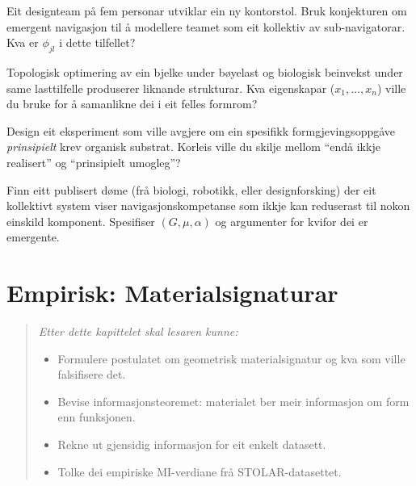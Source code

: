 \begin{exercise}[Nivå 2]\label{ex:6.3}
Eit designteam på fem personar utviklar ein ny kontorstol. Bruk
konjekturen om emergent navigasjon til å modellere teamet som eit
kollektiv av sub-navigatorar. Kva er $\phi_{jl}$ i dette
tilfellet?
\end{exercise}

\begin{exercise}[Nivå 2]\label{ex:6.4}
Topologisk optimering av ein bjelke under bøyelast og biologisk
beinvekst under same lasttilfelle produserer liknande strukturar.
Kva eigenskapar ($x_1, \ldots, x_n$) ville du bruke for å
samanlikne dei i eit felles formrom?
\end{exercise}

\begin{exercise}[Nivå 3]\label{ex:6.5}
Design eit eksperiment som ville avgjere om ein spesifikk
formgjevingsoppgåve \emph{prinsipielt} krev organisk substrat.
Korleis ville du skilje mellom ``endå ikkje realisert'' og
``prinsipielt umogleg''?
\end{exercise}

\begin{exercise}[Nivå 3]\label{ex:6.6}
Finn eitt publisert døme (frå biologi, robotikk, eller
designforsking) der eit kollektivt system viser
navigasjonskompetanse som ikkje kan reduserast til nokon einskild
komponent. Spesifiser $(G, \mu, \alpha)$ og argumenter for kvifor
dei er emergente.
\end{exercise}


\chapter{Empirisk: Materialsignaturar}
\label{chap:empirisk}

\begin{quote}\itshape
Etter dette kapittelet skal lesaren kunne:
\begin{itemize}[nosep]
\item Formulere postulatet om geometrisk materialsignatur og kva som ville falsifisere det.
\item Bevise informasjonsteoremet: materialet ber meir informasjon om form enn funksjonen.
\item Rekne ut gjensidig informasjon for eit enkelt datasett.
\item Tolke dei empiriske MI-verdiane frå STOLAR-datasettet.
\end{itemize}
\end{quote}


